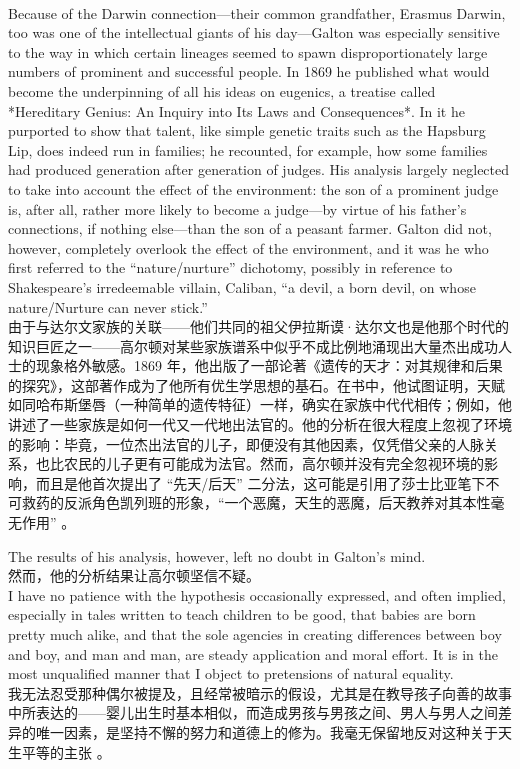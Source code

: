\documentclass{article}
\begin{document}
\\
Because of the Darwin connection—their common grandfather, Erasmus Darwin, too was one of the intellectual giants of his day—Galton was especially sensitive to the way in which certain lineages seemed to spawn disproportionately large numbers of prominent and successful people. In 1869 he published what would become the underpinning of all his ideas on eugenics, a treatise called *Hereditary Genius: An Inquiry into Its Laws and Consequences*. In it he purported to show that talent, like simple genetic traits such as the Hapsburg Lip, does indeed run in families; he recounted, for example, how some families had produced generation after generation of judges. His analysis largely neglected to take into account the effect of the environment: the son of a prominent judge is, after all, rather more likely to become a judge—by virtue of his father’s connections, if nothing else—than the son of a peasant farmer. Galton did not, however, completely overlook the effect of the environment, and it was he who first referred to the “nature/nurture” dichotomy, possibly in reference to Shakespeare’s irredeemable villain, Caliban, “a devil, a born devil, on whose nature/Nurture can never stick.”\\
由于与达尔文家族的关联——他们共同的祖父伊拉斯谟·达尔文也是他那个时代的知识巨匠之一——高尔顿对某些家族谱系中似乎不成比例地涌现出大量杰出成功人士的现象格外敏感。1869 年，他出版了一部论著《遗传的天才：对其规律和后果的探究》，这部著作成为了他所有优生学思想的基石。在书中，他试图证明，天赋如同哈布斯堡唇（一种简单的遗传特征）一样，确实在家族中代代相传；例如，他讲述了一些家族是如何一代又一代地出法官的。他的分析在很大程度上忽视了环境的影响：毕竟，一位杰出法官的儿子，即便没有其他因素，仅凭借父亲的人脉关系，也比农民的儿子更有可能成为法官。然而，高尔顿并没有完全忽视环境的影响，而且是他首次提出了 “先天/后天” 二分法，这可能是引用了莎士比亚笔下不可救药的反派角色凯列班的形象，“一个恶魔，天生的恶魔，后天教养对其本性毫无作用” 。\\


\addtolength{\leftskip}{1cm}

\noindent The results of his analysis, however, left no doubt in Galton’s mind. \\
然而，他的分析结果让高尔顿坚信不疑。\\

\noindent I have no patience with the hypothesis occasionally expressed, and often implied, especially in tales written to teach children to be good, that babies are born pretty much alike, and that the sole agencies in creating differences between boy and boy, and man and man, are steady application and moral effort. It is in the most unqualified manner that I object to pretensions of natural equality.\\
我无法忍受那种偶尔被提及，且经常被暗示的假设，尤其是在教导孩子向善的故事中所表达的——婴儿出生时基本相似，而造成男孩与男孩之间、男人与男人之间差异的唯一因素，是坚持不懈的努力和道德上的修为。我毫无保留地反对这种关于天生平等的主张 。\\
\end{document}
